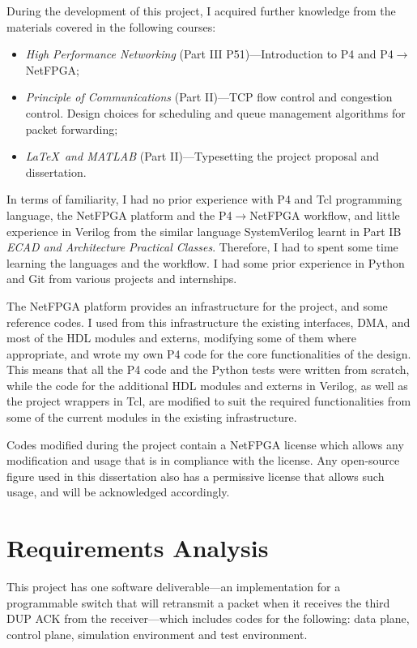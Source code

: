 During the development of this project, I acquired further knowledge from the materials covered in the following courses:%
\begin{itemize}[leftmargin=*, noitemsep]
	\item \textit{High Performance Networking} (Part III P51)---Introduction to P4 and P4$\rightarrow$NetFPGA;%
	\item \textit{Principle of Communications} (Part II)---TCP flow control and congestion control. Design choices for scheduling and queue management algorithms for packet forwarding;%
	\item \textit{\LaTeX \ and MATLAB} (Part II)---Typesetting the project proposal and dissertation.%
\end{itemize}

In terms of familiarity, I had no prior experience with P4 and Tcl programming language, the NetFPGA platform and the P4$\rightarrow$NetFPGA workflow, and little experience in Verilog from the similar language SystemVerilog learnt in Part IB \textit{ECAD and Architecture Practical Classes}. Therefore, I had to spent some time learning the languages and the workflow. I had some prior experience in Python and Git from various projects and internships.

The NetFPGA platform provides an infrastructure for the project, and some reference codes. I used from this infrastructure the existing interfaces, DMA, and most of the HDL modules and externs, modifying some of them where appropriate, and wrote my own P4 code for the core functionalities of the design. This means that all the P4 code and the Python tests were written from scratch, while the code for the additional HDL modules and externs in Verilog, as well as the project wrappers in Tcl, are modified to suit the required functionalities from some of the current modules in the existing infrastructure.

Codes modified during the project contain a NetFPGA license which allows any modification and usage that is in compliance with the license. Any open-source figure used in this dissertation also has a permissive license that allows such usage, and will be acknowledged accordingly.

\section{Requirements Analysis}
\label{sec:req}
This project has one software deliverable---an implementation for a programmable switch that will retransmit a packet when it receives the third DUP ACK from the receiver---which includes codes for the following: data plane, control plane, simulation environment and test environment.

